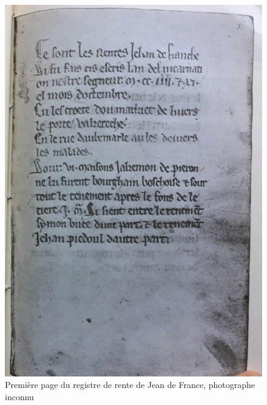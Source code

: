 \begin{figure}[ht] %
    \centering
    \includegraphics[scale=1]{1.Introduction/Img/escris.png}
    \caption{Première page du registre de rente de Jean de France, photographe inconnu}
    \label{fig:planDouaiIntro}
\end{figure}